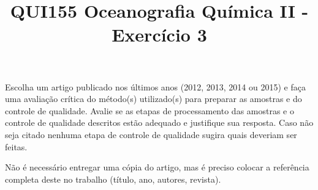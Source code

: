 \documentclass[a4paper,10pt]{article}
\title{QUI155 Oceanografia Química II -Exercício 3}
\author{\vspace{-10ex}}
\date{\vspace{-10ex}}
\begin{document}
  \maketitle
  \onehalfspace

Escolha um artigo publicado nos últimos anos (2012, 2013, 2014 ou 2015) e faça uma avaliação crítica do método(s) utilizado(s) para preparar as amostras e do controle de qualidade. Avalie se as etapas de processamento das amostras e o controle de qualidade descritos estão adequado e justifique sua resposta. Caso não seja citado nenhuma etapa de controle de qualidade sugira quais deveriam ser feitas. 

Não é necessário entregar uma cópia do artigo, mas é preciso colocar a referência completa deste no trabalho (título, ano, autores, revista).


\end{document}
